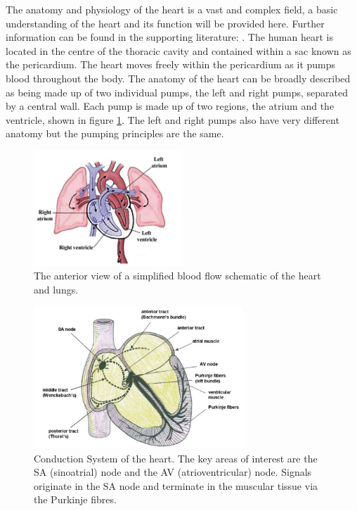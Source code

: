 The anatomy and physiology of the heart is a vast and complex field, a basic understanding of the heart and its function will be provided here. Further information can be found in the supporting literature: \citep{heart1} \citep{heart2} \citep{BasicAnatomy} \citep{ConductionSystem}. The human heart is located in the centre of the thoracic cavity and contained within a sac known as the pericardium. The heart moves freely within the pericardium as it pumps blood throughout the body. The anatomy of the heart can be broadly described as being made up of two individual pumps, the left and right pumps, separated by a central wall. Each pump is made up of two regions, the atrium and the ventricle, shown in figure \ref{fig2.1}. The left and right pumps also have very different anatomy but the pumping principles are the same. \par
\begin{figure}
    \centering
    \includegraphics[width=0.5\textwidth]{images/BasicAnatomy.png}
    \caption{The anterior view of a simplified blood flow schematic of the heart and lungs. \citep{BasicAnatomy}}
        \label{fig2.1}
\end{figure}
\begin{figure}
    \centering
    \includegraphics[width=0.7\textwidth]{images/ConductionSystem}
    \caption{Conduction System of the heart. The key areas of interest are the SA (sinoatrial) node and the AV (atrioventricular) node. Signals originate in the SA node and terminate in the muscular tissue via the Purkinje fibres. \citep{ConductionSystem}}
        \label{fig2.2}
\end{figure}
